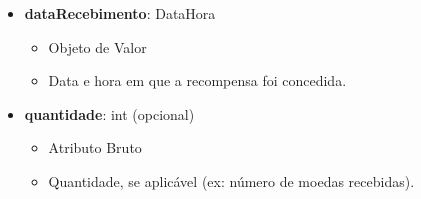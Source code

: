 \begin{itemize}
        \item \textbf{dataRecebimento}: DataHora  
              \begin{itemize}
                  \item Objeto de Valor
                  \item Data e hora em que a recompensa foi concedida.
              \end{itemize}
    
        \item \textbf{quantidade}: int (opcional)  
              \begin{itemize}
                  \item Atributo Bruto
                  \item Quantidade, se aplicável (ex: número de moedas recebidas).
              \end{itemize}
    \end{itemize}
    
